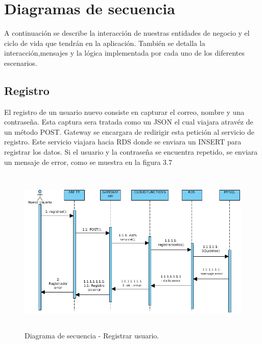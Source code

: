 \newpage
\section{Diagramas de secuencia}
A continuación se describe la interacción de nuestras entidades de negocio y el ciclo de vida que tendrán en la aplicación. También se detalla la interacción,mensajes y la lógica implementada por cada uno de los diferentes escenarios.\par
\subsection{Registro}
El registro de un usuario nuevo consiste en capturar el correo, nombre y una contraseña. Esta captura sera tratada como un JSON el cual viajara atravéz de un método POST. Gateway se encargara de redirigir esta petición al servicio de registro. Este servicio viajara hacia RDS donde se enviara un INSERT para registrar los datos. Si el usuario y la contraseña se encuentra repetido, se enviara un mensaje de error, como se muestra en la figura 3.7
\begin{figure}[h!]
	\centering
	\includegraphics[width=14cm,height=8cm]{imagenes/analisis/DSregistrarUsuario.jpg}
	\caption{Diagrama de secuencia - Registrar usuario.}
	\label{fig:analogo}
\end{figure} 
